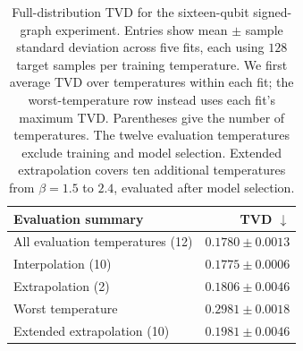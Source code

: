 \begin{table}[!htbp]
\caption{Full-distribution TVD for the sixteen-qubit signed-graph experiment. Entries show mean $\pm$ sample standard deviation across five fits, each using $128$ target samples per training temperature. We first average TVD over temperatures within each fit; the worst-temperature row instead uses each fit's maximum TVD. Parentheses give the number of temperatures. The twelve evaluation temperatures exclude training and model selection. Extended extrapolation covers ten additional temperatures from $\beta=1.5$ to $2.4$, evaluated after model selection.}
\label{tab:switching16}
\centering
\small
\setlength{\tabcolsep}{3pt}
\begin{tabular}{lr}
\toprule
Evaluation summary & TVD $\downarrow$ \\
\midrule
All evaluation temperatures (12) & $0.1780\pm0.0013$ \\
Interpolation (10) & $0.1775\pm0.0006$ \\
Extrapolation (2) & $0.1806\pm0.0046$ \\
Worst temperature & $0.2981\pm0.0018$ \\
\midrule
Extended extrapolation (10) & $0.1981\pm0.0046$ \\
\bottomrule
\end{tabular}
\end{table}
